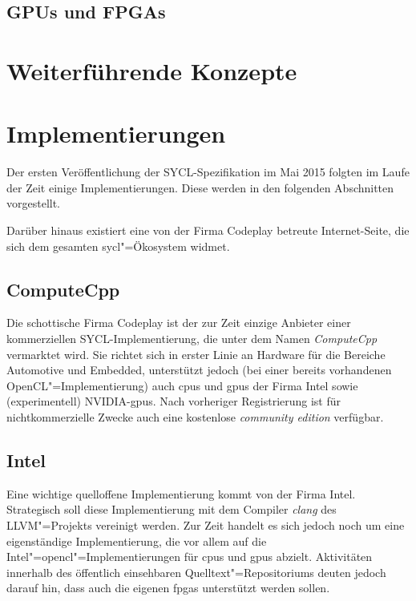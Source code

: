 \subsection{GPUs und FPGAs}\label{sycl:api:abstraktion:gpufpga}

\section{Weiterführende Konzepte}\label{sycl:konzepte}

\section{Implementierungen}\label{sycl:implementierungen}

Der ersten Veröffentlichung der SYCL-Spezifikation im Mai 2015 folgten im Laufe
der Zeit einige Implementierungen. Diese werden in den folgenden Abschnitten
vorgestellt.

Darüber hinaus existiert eine von der Firma Codeplay betreute Internet-Seite,
die sich dem gesamten \gls{sycl}"=Ökosystem widmet. \cite[vgl.][]{sycltech}

\subsection{ComputeCpp}

Die schottische Firma Codeplay ist der zur Zeit einzige Anbieter einer
kommerziellen SYCL-Implementierung, die unter dem Namen \textit{ComputeCpp}
vermarktet wird. Sie richtet sich in erster Linie an Hardware für die Bereiche
Automotive und Embedded, unterstützt jedoch (bei einer bereits vorhandenen
OpenCL"=Implementierung) auch \gls{cpu}s und \gls{gpu}s der Firma Intel sowie
(experimentell) NVIDIA-\gls{gpu}s. Nach vorheriger Registrierung ist für
nichtkommerzielle Zwecke auch eine kostenlose \textit{community edition}
verfügbar. \cite[vgl.][]{computecpp}

\subsection{Intel}

Eine wichtige quelloffene Implementierung kommt von der Firma Intel. Strategisch
soll diese Implementierung mit dem Compiler \textit{clang} des LLVM"=Projekts
vereinigt werden. Zur Zeit handelt es sich jedoch noch um eine eigenständige
Implementierung, die vor allem auf die Intel"=\gls{opencl}"=Implementierungen
für \gls{cpu}s und \gls{gpu}s abzielt. Aktivitäten innerhalb des öffentlich
einsehbaren Quelltext"=Repositoriums deuten jedoch darauf hin, dass auch die
eigenen \gls{fpga}s unterstützt werden sollen. \cite[vgl.][]{intelsycl}

